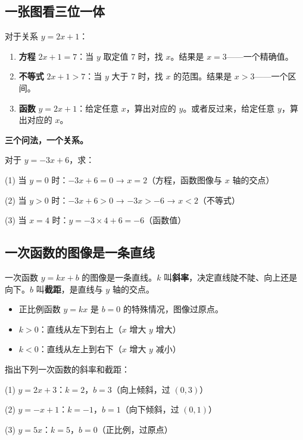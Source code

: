 \subsection*{一张图看三位一体}

对于关系 $y = 2x + 1$：

\begin{enumerate}
  \item \textbf{方程} $2x+1=7$：当 $y$ 取定值 $7$ 时，找 $x$。结果是 $x=3$——一个精确值。
  \item \textbf{不等式} $2x+1>7$：当 $y$ 大于 $7$ 时，找 $x$ 的范围。结果是 $x>3$——一个区间。
  \item \textbf{函数} $y=2x+1$：给定任意 $x$，算出对应的 $y$。或者反过来，给定任意 $y$，算出对应的 $x$。
\end{enumerate}

\textbf{三个问法，一个关系。}

\begin{example}
对于 $y = -3x + 6$，求：
\end{example}
\begin{solution}
(1) 当 $y=0$ 时：$-3x+6=0$ → $x=2$（方程，函数图像与 $x$ 轴的交点）

(2) 当 $y>0$ 时：$-3x+6>0$ → $-3x>-6$ → $x<2$（不等式）

(3) 当 $x=4$ 时：$y=-3\times4+6=-6$（函数值）
\end{solution}

\subsection*{一次函数的图像是一条直线}

一次函数 $y=kx+b$ 的图像是一条直线。$k$ 叫\textbf{斜率}，决定直线陡不陡、向上还是向下。$b$ 叫\textbf{截距}，是直线与 $y$ 轴的交点。

\begin{itemize}
  \item 正比例函数 $y=kx$ 是 $b=0$ 的特殊情况，图像过原点。
  \item $k>0$：直线从左下到右上（$x$ 增大 $y$ 增大）
  \item $k<0$：直线从左上到右下（$x$ 增大 $y$ 减小）
\end{itemize}

\begin{example}
指出下列一次函数的斜率和截距：
\end{example}
\begin{solution}
(1) $y=2x+3$：$k=2$，$b=3$（向上倾斜，过 $(0,3)$）

(2) $y=-x+1$：$k=-1$，$b=1$（向下倾斜，过 $(0,1)$）

(3) $y=5x$：$k=5$，$b=0$（正比例，过原点）
\end{solution}

